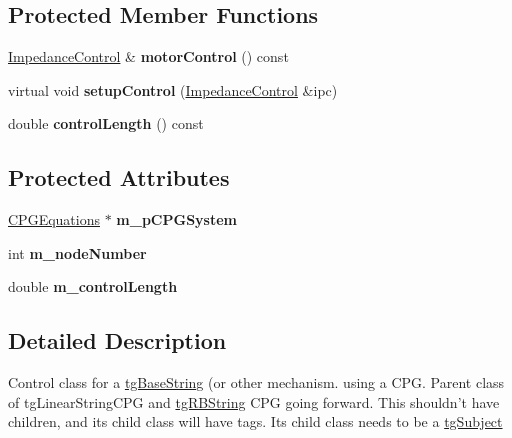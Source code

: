 \subsection*{Protected Member Functions}
\begin{DoxyCompactItemize}
\item 
\hypertarget{classtg_base_c_p_g_node_ab23a06a31ca175c2ca7e867db10a6db9}{\hyperlink{class_impedance_control}{Impedance\-Control} \& {\bfseries motor\-Control} () const }\label{classtg_base_c_p_g_node_ab23a06a31ca175c2ca7e867db10a6db9}

\item 
\hypertarget{classtg_base_c_p_g_node_a01718840bdddd28ce7f86cca2b8ebe34}{virtual void {\bfseries setup\-Control} (\hyperlink{class_impedance_control}{Impedance\-Control} \&ipc)}\label{classtg_base_c_p_g_node_a01718840bdddd28ce7f86cca2b8ebe34}

\item 
\hypertarget{classtg_base_c_p_g_node_a4e868b27cfcd8b7115ba993c81562bd6}{double {\bfseries control\-Length} () const }\label{classtg_base_c_p_g_node_a4e868b27cfcd8b7115ba993c81562bd6}

\end{DoxyCompactItemize}
\subsection*{Protected Attributes}
\begin{DoxyCompactItemize}
\item 
\hypertarget{classtg_base_c_p_g_node_a87e8927be524dde55bec9fdaccdeaf64}{\hyperlink{class_c_p_g_equations}{C\-P\-G\-Equations} $\ast$ {\bfseries m\-\_\-p\-C\-P\-G\-System}}\label{classtg_base_c_p_g_node_a87e8927be524dde55bec9fdaccdeaf64}

\item 
\hypertarget{classtg_base_c_p_g_node_a5f07d4e24cf6790cf989959409694b04}{int {\bfseries m\-\_\-node\-Number}}\label{classtg_base_c_p_g_node_a5f07d4e24cf6790cf989959409694b04}

\item 
\hypertarget{classtg_base_c_p_g_node_ae974485a511a40f14b07f1ed61b13421}{double {\bfseries m\-\_\-control\-Length}}\label{classtg_base_c_p_g_node_ae974485a511a40f14b07f1ed61b13421}

\end{DoxyCompactItemize}


\subsection{Detailed Description}
Control class for a \hyperlink{classtg_base_string}{tg\-Base\-String} (or other mechanism. using a C\-P\-G. Parent class of tg\-Linear\-String\-C\-P\-G and \hyperlink{classtg_r_b_string}{tg\-R\-B\-String} C\-P\-G going forward. This shouldn't have children, and its child class will have tags. Its child class needs to be a \hyperlink{classtg_subject}{tg\-Subject} 


